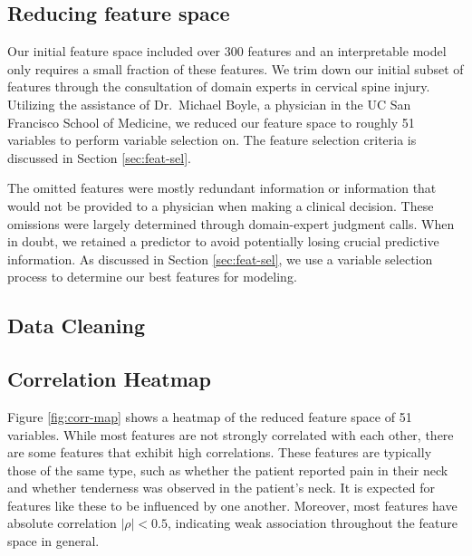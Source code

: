 \documentclass[
]{article}
\begin{document}
\hypertarget{reducing-feature-space}{%
\subsection{Reducing feature space}\label{reducing-feature-space}}

Our initial feature space included over 300 features and an
interpretable model only requires a small fraction of these features. We
trim down our initial subset of features through the consultation of
domain experts in cervical spine injury. Utilizing the assistance of
Dr.~Michael Boyle, a physician in the UC San Francisco School of
Medicine, we reduced our feature space to roughly 51 variables to
perform variable selection on. The feature selection criteria is
discussed in Section \textcolor{blue}{\ref{sec:feat-sel}}.

The omitted features were mostly redundant information or information
that would not be provided to a physician when making a clinical
decision. These omissions were largely determined through domain-expert
judgment calls. When in doubt, we retained a predictor to avoid
potentially losing crucial predictive information. As discussed in
Section \textcolor{blue}{\ref{sec:feat-sel}}, we use a variable
selection process to determine our best features for modeling.

\hypertarget{sec:clean}{%
\subsection{Data Cleaning}\label{sec:clean}}

\hypertarget{correlation-heatmap}{%
\subsection{Correlation Heatmap}\label{correlation-heatmap}}

Figure \textcolor{blue}{\ref{fig:corr-map}} shows a heatmap of the
reduced feature space of 51 variables. While most features are not
strongly correlated with each other, there are some features that
exhibit high correlations. These features are typically those of the
same type, such as whether the patient reported pain in their neck and
whether tenderness was observed in the patient's neck. It is expected
for features like these to be influenced by one another. Moreover, most
features have absolute correlation \(|\rho| < 0.5\), indicating weak
association throughout the feature space in general.
\end{document}
